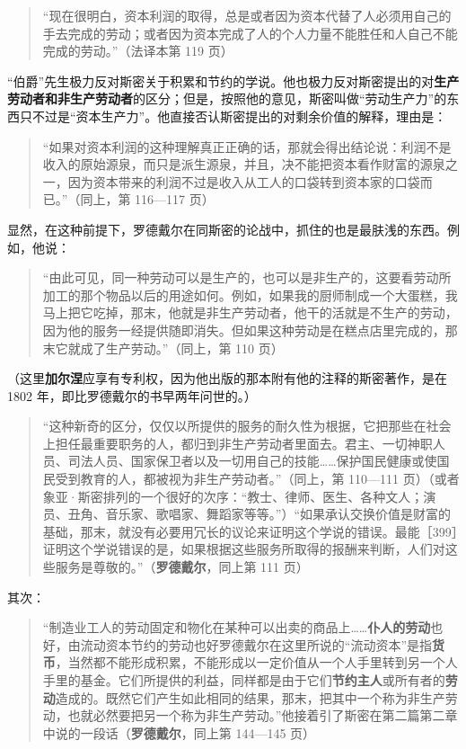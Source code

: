 \begin{quote}“现在很明白，资本利润的取得，总是或者因为资本代替了人必须用自己的手去完成的劳动；或者因为资本完成了人的个人力量不能胜任和人自己不能完成的劳动。”（法译本第 119 页）\end{quote}

“伯爵”先生极力反对斯密关于积累和节约的学说。他也极力反对斯密提出的对\textbf{生产劳动者和非生产劳动者}的区分；但是，按照他的意见，斯密叫做“劳动生产力”的东西只不过是“资本生产力”。他直接否认斯密提出的对剩余价值的解释，理由是：

\begin{quote}“如果对资本利润的这种理解真正正确的话，那就会得出结论说：利润不是收入的原始源泉，而只是派生源泉，并且，决不能把资本看作财富的源泉之一，因为资本带来的利润不过是收入从工人的口袋转到资本家的口袋而已。”（同上，第 116—117 页）\end{quote}

显然，在这种前提下，罗德戴尔在同斯密的论战中，抓住的也是最肤浅的东西。例如，他说：

\begin{quote}“由此可见，同一种劳动可以是生产的，也可以是非生产的，这要看劳动所加工的那个物品以后的用途如何。例如，如果我的厨师制成一个大蛋糕，我马上把它吃掉，那末，他就是非生产劳动者，他干的活就是不生产的劳动，因为他的服务一经提供随即消失。但如果这种劳动是在糕点店里完成的，那末它就成了生产劳动。”（同上，第 110 页）\end{quote}

（这里\textbf{加尔涅}应享有专利权，因为他出版的那本附有他的注释的斯密著作，是在 1802 年，即比罗德戴尔的书早两年问世的。）

\begin{quote}“这种新奇的区分，仅仅以所提供的服务的耐久性为根据，它把那些在社会上担任最重要职务的人，都归到非生产劳动者里面去。君主、一切神职人员、司法人员、国家保卫者以及一切用自己的技能……保护国民健康或使国民受到教育的人，都被视为非生产劳动者。”（同上，第 110—111 页）（或者象亚·斯密排列的一个很好的次序：“教士、律师、医生、各种文人；演员、丑角、音乐家、歌唱家、舞蹈家等等。”）“如果承认交换价值是财富的基础，那末，就没有必要用冗长的议论来证明这个学说的错误。最能［399］证明这个学说错误的是，如果根据这些服务所取得的报酬来判断，人们对这些服务是尊敬的。”（\textbf{罗德戴尔}，同上第 111 页）\end{quote}

其次：

\begin{quote}“制造业工人的劳动固定和物化在某种可以出卖的商品上……\textbf{仆人的劳动}也好，由流动资本节约的劳动也好\fontbox{~\{}罗德戴尔在这里所说的“流动资本”是指\textbf{货币}\fontbox{\}~}，当然都不能形成积累，不能形成以一定价值从一个人手里转到另一个人手里的基金。它们所提供的利益，同样都是由于它们\textbf{节约主人}或所有者的\textbf{劳动}造成的。既然它们产生如此相同的结果，那末，把其中一个称为非生产劳动，也就必然要把另一个称为非生产劳动。”\fontbox{~\{}他接着引了斯密在第二篇第二章中说的一段话\fontbox{\}~}（\textbf{罗德戴尔}，同上第 144—145 页）\end{quote}

